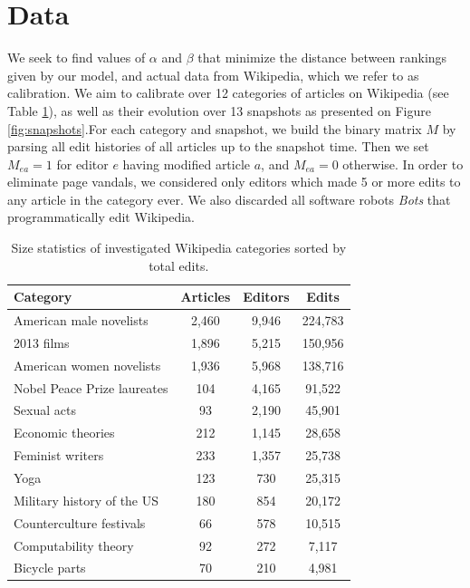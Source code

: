 \section{Data}

We seek to find values of $\alpha$ and $\beta$ that minimize the distance between rankings given by our model, and actual data from Wikipedia, which we refer to as calibration.
We aim to calibrate over 12 categories of articles on Wikipedia (see Table \ref{tab:statistics}), as well as their evolution over 13 snapshots as presented on Figure \ref{fig:snapshots}.For each category and snapshot, we build the binary matrix $M$ by parsing all edit histories of all articles up to the snapshot time. Then we set $M_{ea} = 1$ for editor $e$ having modified article $a$, and $M_{ea} = 0$ otherwise. In order to eliminate page vandals, we considered only editors which made 5 or more edits to any article in the category ever. We also discarded all software robots {\it Bots} that programmatically edit Wikipedia. 

\begin{table}
\begin{tabular}{|l|c|c|c|}
\hline
{\bf Category} &  {\bf Articles} &  {\bf Editors} &  {\bf Edits} \\
\hline
American male novelists               &      2,460 &   9,946 &  224,783 \\
2013 films                            &      1,896 &   5,215 &  150,956 \\
American women novelists              &      1,936 &   5,968 &  138,716 \\
Nobel Peace Prize laureates           &       104 &   4,165 &   91,522 \\
Sexual acts                           &        93 &   2,190 &   45,901 \\
Economic theories                     &       212 &   1,145 &   28,658 \\
Feminist writers                      &       233 &   1,357 &   25,738 \\
Yoga                                  &       123 &    730 &   25,315 \\
Military history of the US &       180 &    854 &   20,172 \\
Counterculture festivals              &        66 &    578 &   10,515 \\
Computability theory                  &        92 &    272 &    7,117 \\
Bicycle parts                         &        70 &    210 &    4,981 \\
\hline
\end{tabular}
\caption{Size statistics of investigated Wikipedia categories sorted by total edits.}
\label{tab:statistics}
\end{table}

